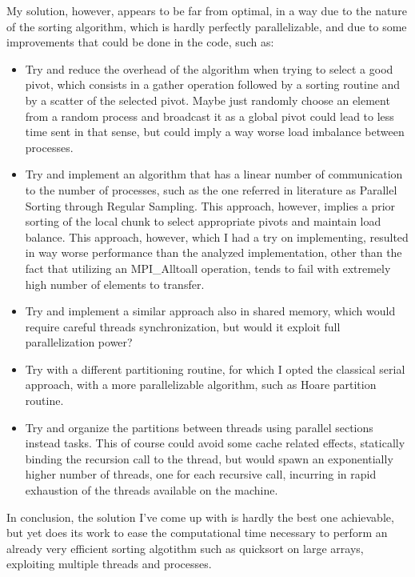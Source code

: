 \documentclass{article}
\begin{document}
	My solution, however, appears to be far from optimal, in a way due to the nature of the sorting algorithm, which is hardly perfectly parallelizable, and due to some improvements that could be done in the code, such as:
	\begin{itemize}
		\item Try and reduce the overhead of the algorithm when trying to select a good pivot, which consists in a gather operation followed by a sorting routine and by a scatter of the selected pivot. Maybe just randomly choose an element from a random process and broadcast it as a global pivot could lead to less time sent in that sense, but could imply a way worse load imbalance between processes.
		\item Try and implement an algorithm that has a linear number of communication to the number of processes, such as the one referred in literature as Parallel Sorting through Regular Sampling. This approach, however, implies a prior sorting of the local chunk to select appropriate pivots and maintain load balance. This approach, however, which I had a try on implementing, resulted in way worse performance than the analyzed implementation, other than the fact that utilizing an MPI\_Alltoall operation, tends to fail with extremely high number of elements to transfer.
		\item Try and implement a similar approach also in shared memory, which would require careful threads synchronization, but would it exploit full parallelization power?
		\item Try with a different partitioning routine, for which I opted the classical serial approach, with a more parallelizable algorithm, such as Hoare partition routine.
		\item Try and organize the partitions between threads using parallel sections instead tasks. This of course could avoid some cache related effects, statically binding the recursion call to the thread, but would spawn an exponentially higher number of threads, one for each recursive call, incurring in rapid exhaustion of the threads available on the machine.
	\end{itemize}
	
	In conclusion, the solution I've come up with is hardly the best one achievable, but yet does its work to ease the computational time necessary to perform an already very efficient sorting algotithm such as quicksort on large arrays, exploiting multiple threads and processes.
	
	\newpage
	
	
	 
\end{document}
